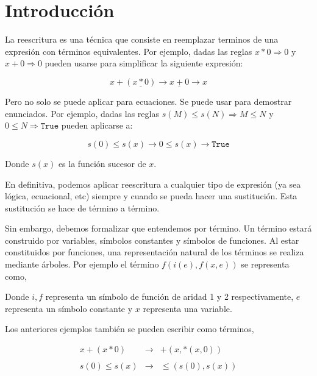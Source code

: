 \chapter{Introducción}

La reescritura es una técnica que consiste en reemplazar terminos de
una expresión con términos equivalentes. Por ejemplo, dadas las reglas
$x * 0 \Rightarrow 0$ y $x + 0 \Rightarrow 0$ pueden usarse para
simplificar la siguiente expresión:

\[
x + (\underline{x*0}) \longrightarrow \underline{x + 0} \longrightarrow x
\]

Pero no solo se puede aplicar para ecuaciones. Se puede usar para
demostrar enunciados. Por ejemplo, dadas las reglas
$s(M) \leq s(N) \Rightarrow M \leq N$ y
$0 \leq N \Rightarrow \texttt{True}$ pueden aplicarse a:

\[
  s(0) \leq s(x) \longrightarrow 0 \leq s(x) \longrightarrow
  \texttt{True}
\]

Donde $s(x)$ es la función sucesor de $x$.

En definitiva, podemos aplicar reescritura a cualquier tipo de
expresión (ya sea lógica, ecuacional, etc) siempre y cuando se pueda
hacer una sustitución. Esta sustitución se hace de término a término.

Sin embargo, debemos formalizar que entendemos por término. Un término
estará construido por variables, símbolos constantes y símbolos de
funciones. Al estar constituidos por funciones, una representación
natural de los términos se realiza mediante árboles. Por ejemplo el
término $f(i(e),f(x,e))$ se representa como,

\begin{figure}[h]
  \centering
\end{figure}

Donde $i,f$ representa un símbolo de función de aridad 1 y 2
respectivamente, $e$ representa un símbolo constante y $x$ representa
una variable.

Los anteriores ejemplos también se pueden escribir como términos,

\[
  \begin{array}{rcl}
    x +(x*0) & \longrightarrow  & +(x,*(x,0)) \\ \\
    s(0) \leq s(x) & \longrightarrow & \leq(s(0),s(x)) \\ \\

  \end{array} 
\]

